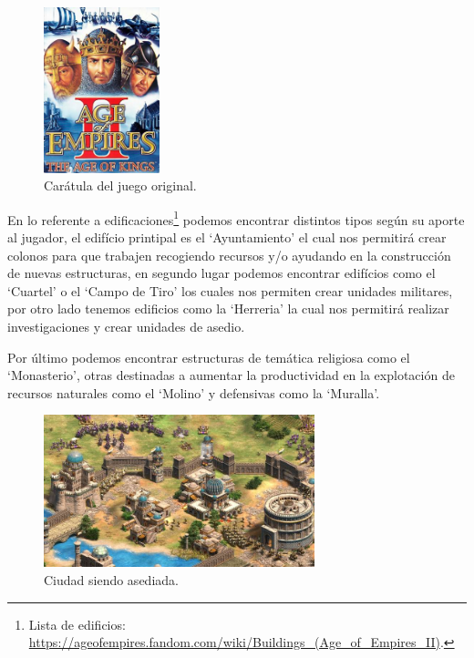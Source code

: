 \begin{figure}[ht]
\centering
\includegraphics[width=0.3\textwidth]{imagenes/marco_teo/referentes/aoe_1.png}
\caption{Carátula del juego original.}
\label{img:aoe_1}
\end{figure}

En lo referente a edificaciones\footnote{Lista de edificios: \url{https://ageofempires.fandom.com/wiki/Buildings_(Age_of_Empires_II)}.}
podemos encontrar distintos tipos según su aporte al jugador,
el edifício printipal es el `Ayuntamiento' el cual nos permitirá crear colonos para que trabajen
recogiendo recursos y/o ayudando en la construcción de nuevas estructuras, en segundo lugar podemos
encontrar edifícios como el `Cuartel' o el `Campo de Tiro' los cuales nos permiten crear unidades
militares, por otro lado tenemos edificios como la `Herreria' la cual nos permitirá realizar investigaciones
y crear unidades de asedio.

Por último podemos encontrar estructuras de temática religiosa como el `Monasterio', otras 
destinadas a aumentar la productividad en la explotación de recursos naturales como el 
`Molino' y defensivas como la `Muralla'. 

\begin{figure}[ht]
\centering
\includegraphics[width=0.7\textwidth]{imagenes/marco_teo/referentes/aoe_2.png}
\caption{Ciudad siendo asediada.}
\label{img:aoe_2}
\end{figure}

